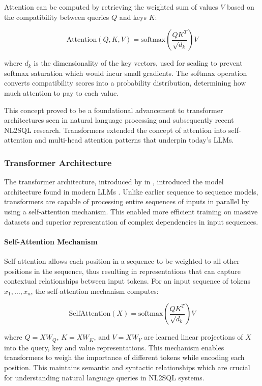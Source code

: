 Attention can be computed by retrieving the weighted sum of values $V$
based on the compatibility between queries $Q$ and keys $K$:

\begin{equation}
\text{Attention}(Q, K, V) = \text{softmax}\left(\frac{QK^T}{\sqrt{d_k}}\right)V
\end{equation}

where $d_k$ is the dimensionality of the key vectors, used for scaling to
prevent softmax saturation which would incur small gradients. The softmax
operation converts compatibility scores into a probability distribution,
determining how much attention to pay to each value.

This concept proved to be a foundational advancement to transformer
architectures seen in natural language processing and subsequently recent
NL2SQL research. Transformers extended the concept of attention into
self-attention and multi-head attention patterns that underpin today's LLMs.

\subsubsection{Transformer Architecture}

The transformer architecture, introduced by \citeauthor{Attention}
in \citeyear{Attention}, introduced the model architecture found in
modern LLMs \citep{Attention}. Unlike earlier sequence to sequence models,
transformers are capable of processing entire sequences of inputs in parallel
by using a self-attention mechanism. This enabled more efficient training on
massive datasets and superior representation of complex dependencies in input
sequences.

\paragraph{Self-Attention Mechanism}

Self-attention allows each position in a sequence to be weighted to all other
positions in the sequence, thus resulting in representations that can capture
contextual relationships between input tokens. For an input sequence of tokens
$x_1, \ldots, x_n$, the self-attention mechanism computes:

\begin{equation}
\text{SelfAttention}(X) = \text{softmax}\left(\frac{QK^T}{\sqrt{d_k}}\right)V
\end{equation}

where $Q = XW_Q$, $K = XW_K$, and $V = XW_V$ are learned linear projections of
$X$ into the query, key and value representations. This mechanism enables
transformers to weigh the importance of different tokens while encoding each
position. This maintains semantic and syntactic relationships which are crucial
for understanding natural language queries in NL2SQL systems.

